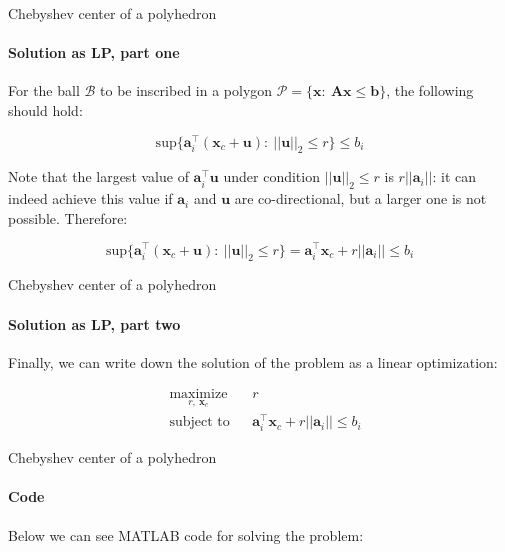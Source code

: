\documentclass{beamer}
\begin{document}
\begin{frame}{Chebyshev center of a polyhedron}
\framesubtitle{Solution as LP, part one}
\begin{flushleft}

For the ball $\mathcal{B}$ to be inscribed in a polygon $\mathcal{P} = \{ \mathbf{x}: \ \mathbf{A}\mathbf{x} \leq \mathbf{b} \}$, the following should hold:

\begin{equation}
    \text{sup} \{ \mathbf{a}_i^\top (\mathbf{x}_c + \mathbf{u}): \ ||\mathbf{u}||_2 \leq r \} \leq b_i
\end{equation}

Note that the largest value of $\mathbf{a}_i^\top \mathbf{u}$ under condition $||\mathbf{u}||_2 \leq r$ is $r ||\mathbf{a}_i||$: it can indeed achieve this value if $\mathbf{a}_i$ and $\mathbf{u}$ are co-directional, but a larger one is not possible. Therefore:

\begin{equation}
    \text{sup} \{ \mathbf{a}_i^\top (\mathbf{x}_c + \mathbf{u}): \ ||\mathbf{u}||_2 \leq r \}  = 
    \mathbf{a}_i^\top \mathbf{x}_c + r ||\mathbf{a}_i||
    \leq b_i
\end{equation}

 
\end{flushleft}
\end{frame}



\begin{frame}{Chebyshev center of a polyhedron}
\framesubtitle{Solution as LP, part two}
\begin{flushleft}

Finally, we can write down the solution of the problem as a linear optimization:

\begin{equation}
\begin{aligned}
& \underset{r, \ \mathbf{x}_c}{\text{maximize}}
& & r \\
& \text{subject to}
& & \mathbf{a}_i^\top \mathbf{x}_c + r ||\mathbf{a}_i||
    \leq b_i
%
\end{aligned}
\end{equation}

 
\end{flushleft}
\end{frame}




\begin{frame}{Chebyshev center of a polyhedron}
\framesubtitle{Code}
\begin{flushleft}

Below we can see MATLAB code for solving the problem:



 
\end{flushleft}
\end{frame}
\end{document}
